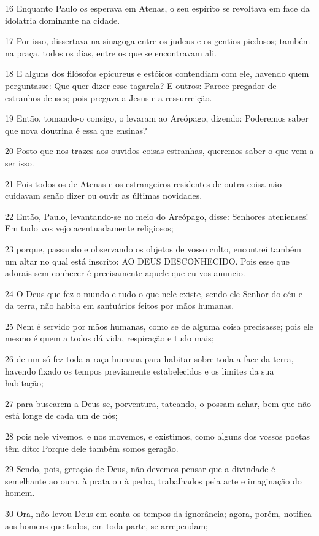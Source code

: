 \par 16 Enquanto Paulo os esperava em Atenas, o seu espírito se revoltava em face da idolatria dominante na cidade.
\par 17 Por isso, dissertava na sinagoga entre os judeus e os gentios piedosos; também na praça, todos os dias, entre os que se encontravam ali.
\par 18 E alguns dos filósofos epicureus e estóicos contendiam com ele, havendo quem perguntasse: Que quer dizer esse tagarela? E outros: Parece pregador de estranhos deuses; pois pregava a Jesus e a ressurreição.
\par 19 Então, tomando-o consigo, o levaram ao Areópago, dizendo: Poderemos saber que nova doutrina é essa que ensinas?
\par 20 Posto que nos trazes aos ouvidos coisas estranhas, queremos saber o que vem a ser isso.
\par 21 Pois todos os de Atenas e os estrangeiros residentes de outra coisa não cuidavam senão dizer ou ouvir as últimas novidades.
\par 22 Então, Paulo, levantando-se no meio do Areópago, disse: Senhores atenienses! Em tudo vos vejo acentuadamente religiosos;
\par 23 porque, passando e observando os objetos de vosso culto, encontrei também um altar no qual está inscrito: AO DEUS DESCONHECIDO. Pois esse que adorais sem conhecer é precisamente aquele que eu vos anuncio.
\par 24 O Deus que fez o mundo e tudo o que nele existe, sendo ele Senhor do céu e da terra, não habita em santuários feitos por mãos humanas.
\par 25 Nem é servido por mãos humanas, como se de alguma coisa precisasse; pois ele mesmo é quem a todos dá vida, respiração e tudo mais;
\par 26 de um só fez toda a raça humana para habitar sobre toda a face da terra, havendo fixado os tempos previamente estabelecidos e os limites da sua habitação;
\par 27 para buscarem a Deus se, porventura, tateando, o possam achar, bem que não está longe de cada um de nós;
\par 28 pois nele vivemos, e nos movemos, e existimos, como alguns dos vossos poetas têm dito: Porque dele também somos geração.
\par 29 Sendo, pois, geração de Deus, não devemos pensar que a divindade é semelhante ao ouro, à prata ou à pedra, trabalhados pela arte e imaginação do homem.
\par 30 Ora, não levou Deus em conta os tempos da ignorância; agora, porém, notifica aos homens que todos, em toda parte, se arrependam;
